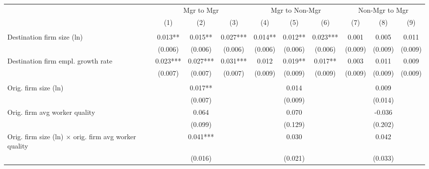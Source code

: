 {
\def\sym#1{\ifmmode^{#1}\else\(^{#1}\)\fi}
\begin{tabular}{l*{9}{c}}
                &\multicolumn{3}{c}{Mgr to Mgr}        &\multicolumn{3}{c}{Mgr to Non-Mgr}    &\multicolumn{3}{c}{Non-Mgr to Mgr}    \\\cmidrule(lr){2-4}\cmidrule(lr){5-7}\cmidrule(lr){8-10}
                &\multicolumn{1}{c}{(1)}   &\multicolumn{1}{c}{(2)}   &\multicolumn{1}{c}{(3)}   &\multicolumn{1}{c}{(4)}   &\multicolumn{1}{c}{(5)}   &\multicolumn{1}{c}{(6)}   &\multicolumn{1}{c}{(7)}   &\multicolumn{1}{c}{(8)}   &\multicolumn{1}{c}{(9)}   \\
\midrule        &            &            &            &            &            &            &            &            &            \\
Destination firm size (ln)&    0.013** &    0.015** &    0.027***&    0.014** &    0.012** &    0.023***&    0.001   &    0.005   &    0.011   \\
                &  (0.006)   &  (0.006)   &  (0.006)   &  (0.006)   &  (0.006)   &  (0.006)   &  (0.009)   &  (0.009)   &  (0.009)   \\
Destination firm empl. growth rate&    0.023***&    0.027***&    0.031***&    0.012   &    0.019** &    0.017** &    0.003   &    0.011   &    0.009   \\
                &  (0.007)   &  (0.007)   &  (0.007)   &  (0.009)   &  (0.009)   &  (0.009)   &  (0.009)   &  (0.009)   &  (0.009)   \\
\\ Orig. firm size (ln)&            &    0.017** &            &            &    0.014   &            &            &    0.009   &            \\
                &            &  (0.007)   &            &            &  (0.009)   &            &            &  (0.014)   &            \\
Orig. firm avg worker quality&            &    0.064   &            &            &    0.070   &            &            &   -0.036   &            \\
                &            &  (0.099)   &            &            &  (0.129)   &            &            &  (0.202)   &            \\
Orig. firm size (ln) $\times$ orig. firm avg worker quality&            &    0.041***&            &            &    0.030   &            &            &    0.042   &            \\
                &            &  (0.016)   &            &            &  (0.021)   &            &            &  (0.033)   &            \\

\end{tabular}}
